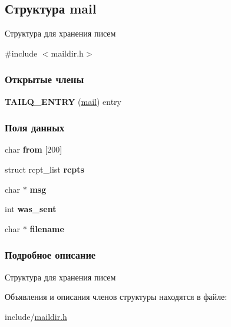 \hypertarget{structmail}{\subsection{Структура mail}
\label{structmail}
}


Структура для хранения писем  




{\ttfamily \#include $<$maildir.\-h$>$}

\subsubsection*{Открытые члены}
\begin{DoxyCompactItemize}
\item 
\hypertarget{structmail_a398048881acc52a59e1c50dd44350468}{{\bfseries T\-A\-I\-L\-Q\-\_\-\-E\-N\-T\-R\-Y} (\hyperlink{structmail}{mail}) entry}\label{structmail_a398048881acc52a59e1c50dd44350468}

\end{DoxyCompactItemize}
\subsubsection*{Поля данных}
\begin{DoxyCompactItemize}
\item 
\hypertarget{structmail_a287dbaa884b0decb63a28ca5bc8d8839}{char {\bfseries from} \mbox{[}200\mbox{]}}\label{structmail_a287dbaa884b0decb63a28ca5bc8d8839}

\item 
\hypertarget{structmail_aa71699ac5b35e162c3791e55d010fb3e}{struct rcpt\-\_\-list {\bfseries rcpts}}\label{structmail_aa71699ac5b35e162c3791e55d010fb3e}

\item 
\hypertarget{structmail_a8286f2f7ae071c1959b247be67d40304}{char $\ast$ {\bfseries msg}}\label{structmail_a8286f2f7ae071c1959b247be67d40304}

\item 
\hypertarget{structmail_a1dc80c20005c3cf5c3d7a9de67f0a6b2}{int {\bfseries was\-\_\-sent}}\label{structmail_a1dc80c20005c3cf5c3d7a9de67f0a6b2}

\item 
\hypertarget{structmail_a1d3bc427795a23c54a4dac8d54ce1ac5}{char $\ast$ {\bfseries filename}}\label{structmail_a1d3bc427795a23c54a4dac8d54ce1ac5}

\end{DoxyCompactItemize}


\subsubsection{Подробное описание}
Структура для хранения писем 

Объявления и описания членов структуры находятся в файле\-:\begin{DoxyCompactItemize}
\item 
include/\hyperlink{maildir_8h}{maildir.\-h}\end{DoxyCompactItemize}
